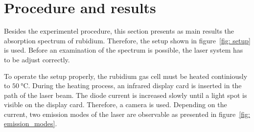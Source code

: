 \section{Procedure and results}\label{sec: procedure}
Besides the experimentel procedure, this section presents as main results the
absorption spectrum of rubidium. Therefore, the setup shown in figure~\ref{fig: setup}
is used. Before an examination of the spectrum is possible, the laser system has to be
adjust correctly.

To operate the setup properly, the rubidium gas cell must be heated
continiously to $\SI{50}{\degreeCelsius}$. During the heating process, an infrared display
card is inserted in the path of the laser beam. The diode current is increased slowly until a
light spot is visible on the display card. Therefore, a camera is used.
Depending on the current, two emission modes of the laser are observable as presented in
figure~\ref{fig: emission_modes}.
